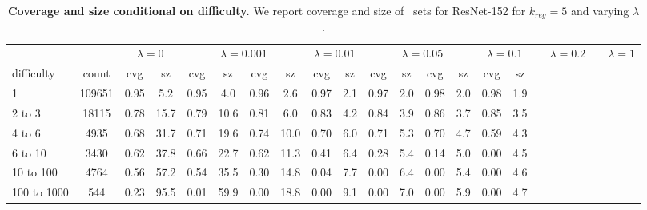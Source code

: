 \begin{table}[t]
\centering
\tiny
\begin{tabular}{lccccccccccccccc} 
\toprule
        & & \multicolumn{2}{c}{$\lambda={0}$}     & & \multicolumn{2}{c}{$\lambda={0.001}$}     & & \multicolumn{2}{c}{$\lambda={0.01}$}     & & \multicolumn{2}{c}{$\lambda={0.05}$}     & & \multicolumn{2}{c}{$\lambda={0.1}$}     & & \multicolumn{2}{c}{$\lambda={0.2}$}     & & \multicolumn{2}{c}{$\lambda={1}$}    \\ 
         \cmidrule(r){3-4}     \cmidrule(r){5-6}     \cmidrule(r){7-8}     \cmidrule(r){9-10}     \cmidrule(r){11-12}     \cmidrule(r){13-14}     \cmidrule(r){15-16}    
difficulty & count & cvg & sz    & cvg & sz    & cvg & sz    & cvg & sz    & cvg & sz    & cvg & sz    & cvg & sz    \\ 
\midrule 
1      & 109651  & 0.95 & 5.2   & 0.95 & 4.0   & 0.96 & 2.6   & 0.97 & 2.1   & 0.97 & 2.0   & 0.98 & 2.0   & 0.98 & 1.9  \\ 
2 to 3      & 18115  & 0.78 & 15.7   & 0.79 & 10.6   & 0.81 & 6.0   & 0.83 & 4.2   & 0.84 & 3.9   & 0.86 & 3.7   & 0.85 & 3.5  \\ 
4 to 6      & 4935  & 0.68 & 31.7   & 0.71 & 19.6   & 0.74 & 10.0   & 0.70 & 6.0   & 0.71 & 5.3   & 0.70 & 4.7   & 0.59 & 4.3  \\ 
6 to 10      & 3430  & 0.62 & 37.8   & 0.66 & 22.7   & 0.62 & 11.3   & 0.41 & 6.4   & 0.28 & 5.4   & 0.14 & 5.0   & 0.00 & 4.5  \\ 
10 to 100      & 4764  & 0.56 & 57.2   & 0.54 & 35.5   & 0.30 & 14.8   & 0.04 & 7.7   & 0.00 & 6.4   & 0.00 & 5.4   & 0.00 & 4.6  \\ 
100 to 1000      & 544  & 0.23 & 95.5   & 0.01 & 59.9   & 0.00 & 18.8   & 0.00 & 9.1   & 0.00 & 7.0   & 0.00 & 5.9   & 0.00 & 4.7  \\ 
\bottomrule
\end{tabular}
\caption{\textbf{Coverage and size conditional on difficulty.} We report coverage and size of \raps\ sets for ResNet-152 for $k_{reg}=5$ and varying $\lambda$.}
\label{table:difficulty}
\end{table}
